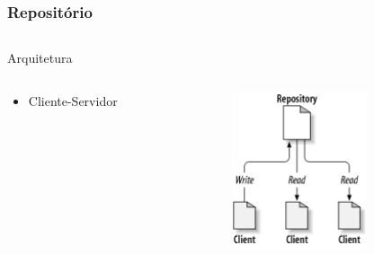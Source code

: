 \documentclass{beamer}
\begin{document}
\begin{frame}
    \frametitle{Reposit\'orio}
    \begin{columns}

        \begin{column}{.555555\textwidth}
            \begin{block}{Arquitetura}
                \begin{columns}
                    \begin{column}{.5\textwidth}
                        \begin{itemize}
                            \item Cliente-Servidor
                        \end{itemize}
                    \end{column}
                    \begin{column}{.5\textwidth}
                        \begin{figure}
                            \includegraphics[width = 0.7\textwidth]{figures/repositorio}
                        \end{figure}
                    \end{column}
                \end{columns}
            \end{block}
        \end{column}


\end{columns}
\end{frame}
\end{document}
